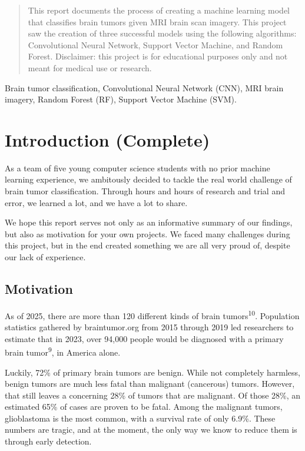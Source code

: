 \documentclass[conference]{IEEEtran}
\begin{document}
\begin{abstract}
This report documents the process of creating a machine learning model that classifies brain tumors given MRI brain scan imagery. This project saw the creation of three successful models using the following algorithms: Convolutional Neural Network, Support Vector Machine, and Random Forest. Disclaimer: this project is for educational purposes only and not meant for medical use or research.
\end{abstract}

\begin{IEEEkeywords}
Brain tumor classification, Convolutional Neural Network (CNN), MRI brain imagery, Random Forest (RF), Support Vector Machine (SVM). 
\end{IEEEkeywords}

\large 
\section{\large Introduction (Complete)}
As a team of five young computer science students with no prior machine learning experience, we ambitously decided to tackle the real world challenge of brain tumor classification. Through hours and hours of research and trial and error, we learned a lot, and we have a lot to share. 

We hope this report serves not only as an informative summary of our findings, but also as motivation for your own projects. We faced many challenges during this project, but in the end created something we are all very proud of, despite our lack of experience.

\subsection{\large Motivation}

As of 2025, there are more than 120 different kinds of brain tumors\textsuperscript{10}. Population statistics gathered by braintumor.org from 2015 through 2019 led researchers to estimate that in 2023, over 94,000 people would be diagnosed with a primary brain tumor\textsuperscript{9}, in America alone. 

Luckily, 72\% of primary brain tumors are benign. While not completely harmless, benign tumors are much less fatal than malignant (cancerous) tumors. However, that still leaves a concerning 28\% of tumors that are malignant. Of those 28\%, an estimated 65\% of cases are proven to be fatal. Among the malignant tumors, glioblastoma is the most common, with a survival rate of only 6.9\%. These numbers are tragic, and at the moment, the only way we know to reduce them is through early detection.
\end{document}

